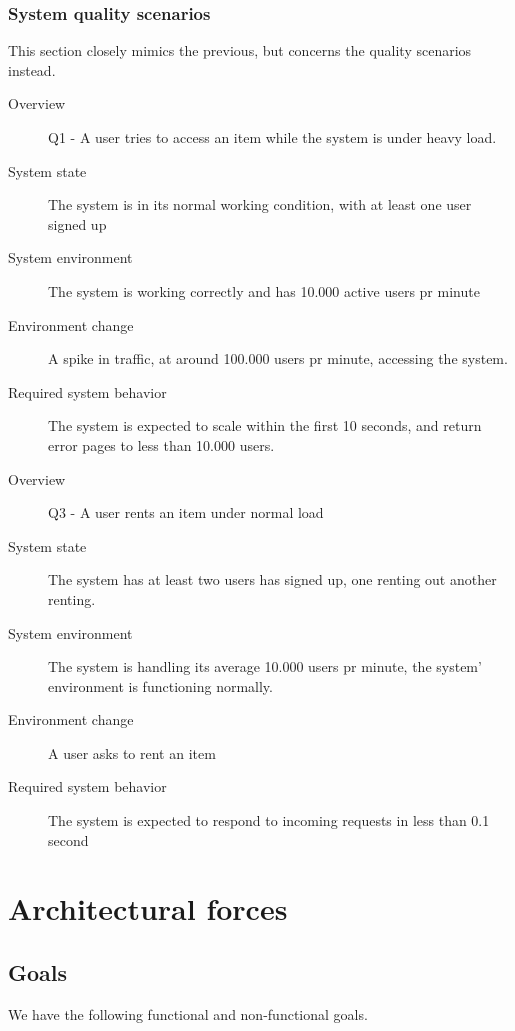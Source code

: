\documentclass[a4paper,11pt]{report}
\begin{document}
\subsection{System quality scenarios}
\label{sec:syst-qual-scen}
This section closely mimics the previous, but concerns the quality scenarios
instead.

\begin{description}
    \item[Overview] Q1 - A user tries to access an item while the system is
        under heavy load.
    \item[System state] The system is in its normal working condition, with at
        least one user signed up
    \item[System environment] The system is working correctly and has 10.000
        active users pr minute
    \item[Environment change] A spike in traffic, at around 100.000 users pr
        minute, accessing the system.
    \item[Required system behavior] The system is expected to scale within the
        first 10 seconds, and return error pages to less than 10.000 users.
\end{description}

\begin{description}
    \item[Overview] Q3 - A user rents an item under normal load
    \item[System state] The system has at least two users has signed up, one
        renting out another renting.
    \item[System environment] The system is handling its average 10.000 users pr
        minute, the system' environment is functioning normally.
    \item[Environment change] A user asks to rent an item
    \item[Required system behavior] The system is expected to respond to
        incoming requests in less than 0.1 second
\end{description}


\chapter{Architectural forces}
\label{cha:architectural-forces}
\thispagestyle{fancy}

\section{Goals}
\label{sec:goals}
We have the following functional and non-functional goals.
\end{document}
